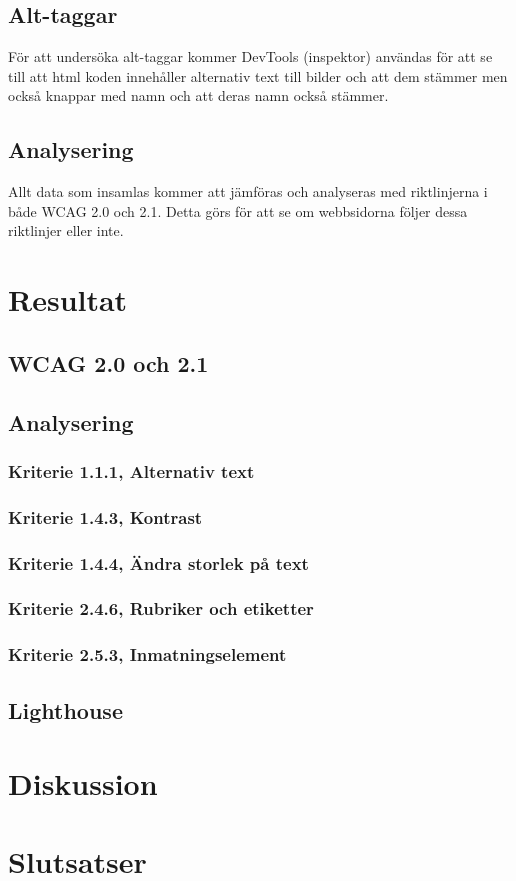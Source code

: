 \documentclass[11p]{article}
\begin{document}
    \subsection{Alt-taggar}
    För att undersöka alt-taggar kommer DevTools (inspektor) användas för att se till att html koden innehåller alternativ text till bilder och att dem stämmer men också knappar med namn och att deras namn också stämmer.

    \subsection{Analysering}

    Allt data som insamlas kommer att jämföras och analyseras med riktlinjerna i både WCAG 2.0 och 2.1.
    Detta görs för att se om webbsidorna följer dessa riktlinjer eller inte.

    \section{Resultat}
    
    \subsection{WCAG 2.0 och 2.1}
    
    \subsection{Analysering}
    
    \subsubsection{Kriterie 1.1.1, Alternativ text}

    \subsubsection{Kriterie 1.4.3, Kontrast}

    \subsubsection{Kriterie 1.4.4, Ändra storlek på text}

    \subsubsection{Kriterie 2.4.6, Rubriker och etiketter}

    \subsubsection{Kriterie 2.5.3, Inmatningselement}

    \subsection{Lighthouse}

    \section{Diskussion}
    
    \section{Slutsatser}


    \printbibliography
\end{document}
